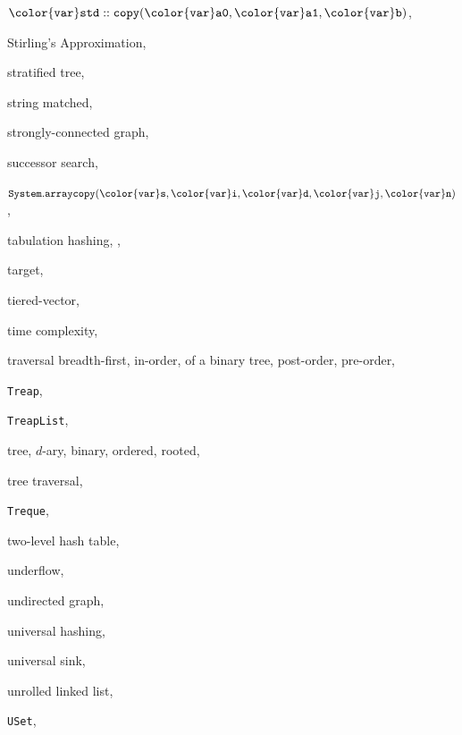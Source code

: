 \documentclass[10pt]{book}
\theoremstyle{plain}
\theoremstyle{definition}
\begin{document}
\begin{theindex}
  \item \ensuremath{\mathtt{{\color{var}std}::copy({\color{var}a0},{\color{var}a1},{\color{var}b})}}, 
  \item Stirling's Approximation, 
  \item stratified tree, 
  \item string
    \subitem matched, 
  \item strongly-connected graph, 
  \item successor search, 
  \item \ensuremath{\mathtt{System.arraycopy({\color{var}s},{\color{var}i},{\color{var}d},{\color{var}j},{\color{var}n})}}, 

  \indexspace

  \item tabulation hashing, , 
  \item target, 
  \item tiered-vector, 
  \item time complexity, 
  \item traversal
    \subitem breadth-first, 
    \subitem in-order, 
    \subitem of a binary tree, 
    \subitem post-order, 
    \subitem pre-order, 
  \item \texttt{Treap}, 
  \item \texttt{TreapList}, 
  \item tree, 
    \subitem $d$-ary, 
    \subitem binary, 
    \subitem ordered, 
    \subitem rooted, 
  \item tree traversal, 
  \item \texttt{Treque}, 
  \item two-level hash table, 

  \indexspace

  \item underflow, 
  \item undirected graph, 
  \item universal hashing, 
  \item universal sink, 
  \item unrolled linked list, 
  \item \texttt{USet}, 


\end{theindex}
\end{document}
